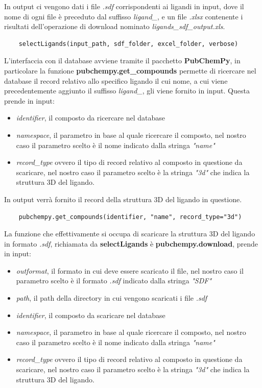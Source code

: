 In output ci vengono dati i file \textit{.sdf} corrispondenti ai ligandi in input, dove il nome di ogni file è preceduto dal suffisso \textit{ligand\_}, e un file \textit{.xlsx} contenente i risultati dell'operazione di download nominato \textit{ligands\_sdf\_output.xls}.

\begin{verbatim}
    selectLigands(input_path, sdf_folder, excel_folder, verbose)
\end{verbatim}

L'interfaccia con il database avviene tramite il pacchetto \textbf{PubChemPy}, in particolare la funzione \textbf{pubchempy.get\_compounds} permette di ricercare nel database il record relativo allo specifico ligando il cui nome, a cui viene precedentemente aggiunto il suffisso \textit{ligand\_}, gli viene fornito in input. Questa prende in input:

\begin{itemize}
    \item \textit{identifier}, il composto da ricercare nel database
    \item \textit{namespace}, il parametro in base al quale ricercare il composto, nel nostro caso il parametro scelto è il nome indicato dalla stringa \textit{"name"}
    \item \textit{record\_type} ovvero il tipo di record relativo al composto in questione da scaricare, 
    nel nostro caso il parametro scelto è la stringa \textit{"3d"} che indica la struttura 3D del ligando.
\end{itemize}

In output verrà fornito il record della struttura 3D del ligando in questione.

\begin{verbatim}
    pubchempy.get_compounds(identifier, "name", record_type="3d")
\end{verbatim}

La funzione che effettivamente si occupa di scaricare la struttura 3D del ligando in formato \textit{.sdf}, richiamata da \textbf{selectLigands} è \textbf{pubchempy.download}, prende in input:

\begin{itemize}
    \item \textit{outformat}, il formato in cui deve essere scaricato il file,  nel nostro caso il parametro scelto è il formato \textit{.sdf} indicato dalla stringa \textit{"SDF"}
    \item \textit{path}, il path della directory in cui vengono scaricati i file \textit{.sdf}
    \item \textit{identifier}, il composto da scaricare nel database
    \item \textit{namespace}, il parametro in base al quale ricercare il composto, nel nostro caso il parametro scelto è il nome indicato dalla stringa \textit{"name"}
    \item \textit{record\_type} ovvero il tipo di record relativo al composto in questione da scaricare, 
    nel nostro caso il parametro scelto è la stringa \textit{"3d"} che indica la struttura 3D del ligando.
\end{itemize}

